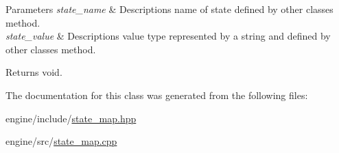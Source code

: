 \begin{DoxyParams}{Parameters}
{\em state\+\_\+name} & Description\textquotesingle{}s name of state defined by other classes method. \\
\hline
{\em state\+\_\+value} & Description\textquotesingle{}s value type represented by a string and defined by other classes method. \\
\hline
\end{DoxyParams}
\begin{DoxyReturn}{Returns}
void. 
\end{DoxyReturn}


The documentation for this class was generated from the following files\+:\begin{DoxyCompactItemize}
\item 
engine/include/\hyperlink{state__map_8hpp}{state\+\_\+map.\+hpp}\item 
engine/src/\hyperlink{state__map_8cpp}{state\+\_\+map.\+cpp}\end{DoxyCompactItemize}
